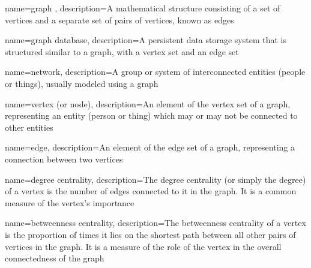\usepackage{booktabs}
\usepackage{longtable}
\usepackage{graphicx}
\usepackage[bf,singlelinecheck=off]{caption}
\usepackage[scale=.8]{sourcecodepro}


\usepackage{framed,color}

\renewcommand{\textfraction}{0.05}
\renewcommand{\topfraction}{0.8}
\renewcommand{\bottomfraction}{0.8}
\renewcommand{\floatpagefraction}{0.75}

\renewenvironment{quote}{\begin{VF}}{\end{VF}}
\let\oldhref\href
\renewcommand{\href}[2]{#2\footnote{\url{#1}}}

\makeatletter


\usepackage{makeidx}
\makeindex


\usepackage{amsthm}
\makeatletter
\def\thm@space@setup{%
  \thm@preskip=8pt plus 2pt minus 4pt
  \thm@postskip=\thm@preskip
}
\makeatother

\usepackage[nonumberlist]{glossaries}
\makenoidxglossaries

{
    name={graph },
    description={A mathematical structure consisting of a set of vertices and a separate set of pairs of vertices, known as edges}
}

{
    name={graph database},
    description={A persistent data storage system that is structured similar to a graph, with a vertex set and an edge set}
}

{
    name={network},
    description={A group or system of interconnected entities (people or things), usually modeled using a graph}
}


{
    name={vertex (or node)},
    description={An element of the vertex set of a graph, representing an entity (person or thing) which may or may not be connected to other entities}
}

{
    name={edge},
    description={An element of the edge set of a graph, representing a connection between two vertices}
}

{
    name={degree centrality},
    description={The degree centrality (or simply the degree) of a vertex is the number of edges connected to it in the graph. It is a common measure of the vertex's importance}
}

{
    name={betweenness centrality},
    description={The betweenness centrality of a vertex is the proportion of times it lies on the shortest path between all other pairs of vertices in the graph. It is a measure of the role of the vertex in the overall connectedness of the graph}
}


